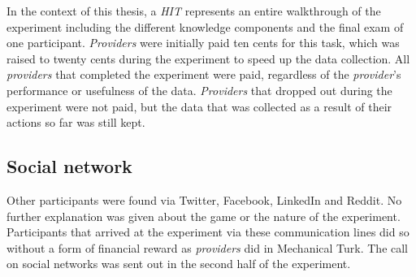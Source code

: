In the context of this thesis, a \emph{HIT} represents an entire walkthrough of
the experiment including the different knowledge components and the final exam
of one participant. \emph{Providers} were initially paid ten cents for this task,
which was raised to twenty cents during the experiment to speed up the data
collection. All \emph{providers} that completed the experiment were paid,
regardless of the \emph{provider}'s performance or usefulness of the data.
\emph{Providers} that dropped out during the experiment were not paid, but the data
that was collected as a result of their actions so far was still kept.
\subsection{Social network}
Other participants were found via Twitter, Facebook, LinkedIn and Reddit. No
further explanation was given about the game or the nature of the experiment.
Participants that arrived at the experiment via these communication lines did
so without a form of financial reward as \emph{providers} did in Mechanical
Turk. The call on social networks was sent out in the second half of the
experiment.
